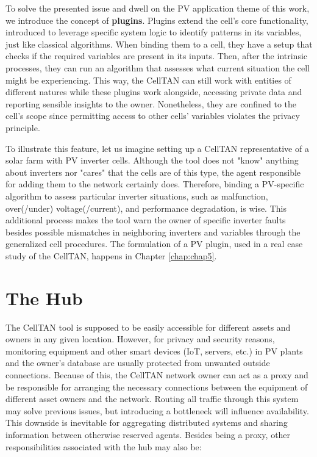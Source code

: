 To solve the presented issue and dwell on the PV application theme of this work, we introduce the concept of \textbf{plugins}. Plugins extend the cell's core functionality, introduced to leverage specific system logic to identify patterns in its variables, just like classical algorithms. When binding them to a cell, they have a setup that checks if the required variables are present in its inputs. Then, after the intrinsic processes, they can run an algorithm that assesses what current situation the cell might be experiencing. This way, the CellTAN can still work with entities of different natures while these plugins work alongside, accessing private data and reporting sensible insights to the owner. Nonetheless, they are confined to the cell's scope since permitting access to other cells' variables violates the privacy principle.

To illustrate this feature, let us imagine setting up a CellTAN representative of a solar farm with PV inverter cells. Although the tool does not "know" anything about inverters nor "cares" that the cells are of this type, the agent responsible for adding them to the network certainly does. Therefore, binding a PV-specific algorithm to assess particular inverter situations, such as malfunction, over(/under) voltage(/current), and performance degradation, is wise. This additional process makes the tool warn the owner of specific inverter faults besides possible mismatches in neighboring inverters and variables through the generalized cell procedures. The formulation of a PV plugin, used in a real case study of the CellTAN, happens in Chapter \ref{chap:chap5}.

\section{The Hub}

The CellTAN tool is supposed to be easily accessible for different assets and owners in any given location. However, for privacy and security reasons, monitoring equipment and other smart devices (IoT, servers, etc.) in PV plants and the owner's database are usually protected from unwanted outside connections. Because of this, the CellTAN network owner can act as a proxy and be responsible for arranging the necessary connections between the equipment of different asset owners and the network. Routing all traffic through this system may solve previous issues, but introducing a bottleneck will influence availability. This downside is inevitable for aggregating distributed systems and sharing information between otherwise reserved agents. Besides being a proxy, other responsibilities associated with the hub may also be:

